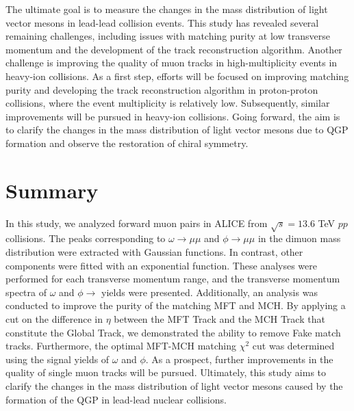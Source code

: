     The ultimate goal is to measure the changes in the mass distribution of light vector mesons in lead-lead collision events. This study has revealed several remaining challenges, including issues with matching purity at low transverse momentum and the development of the track reconstruction algorithm. Another challenge is improving the quality of muon tracks in high-multiplicity events in heavy-ion collisions. As a first step, efforts will be focused on improving matching purity and developing the track reconstruction algorithm in proton-proton collisions, where the event multiplicity is relatively low. 
    Subsequently, similar improvements will be pursued in heavy-ion collisions. 
    Going forward, the aim is to clarify the changes in the mass distribution of light vector mesons due to QGP formation and observe the restoration of chiral symmetry.
\section{Summary}
    In this study, we analyzed forward muon pairs in ALICE from $\sqrt{s} = 13.6$ TeV $pp$ collisions. 
    The peaks corresponding to $\omega \rightarrow \mu\mu$ and $\phi \rightarrow \mu\mu$ in the dimuon mass distribution were extracted with Gaussian functions. In contrast, other components were fitted with an exponential function. 
    These analyses were performed for each transverse momentum range, and the transverse momentum spectra of $\omega$ and $\phi \rightarrow$ yields were presented. 
    Additionally, an analysis was conducted to improve the purity of the matching MFT and MCH.
    By applying a cut on the difference in $\eta$ between the MFT Track and the MCH Track that constitute the Global Track, we demonstrated the ability to remove Fake match tracks.
    Furthermore, the optimal MFT-MCH matching $\chi^2$ cut was determined using the signal yields of $\omega$ and $\phi$.
    As a prospect, further improvements in the quality of single muon tracks will be pursued. Ultimately, this study aims to clarify the changes in the mass distribution of light vector mesons caused by the formation of the QGP in lead-lead nuclear collisions.
